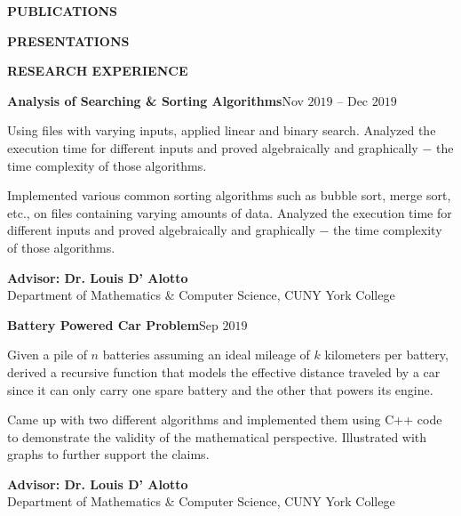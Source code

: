 \documentclass[a4paper, 12pt]{article}
\begin{document}
\newpage
\begin{flushleft}
\faBookOpen\quad\textbf{PUBLICATIONS}
\nocite{*}
\printbibliography[heading=none, type=article]
\end{flushleft}

\begin{flushleft}
\faChalkboardTeacher\quad\textbf{PRESENTATIONS}
\printbibliography[heading=none, type=misc]
\end{flushleft}

\begin{flushleft}
\faAtom\quad\textbf{RESEARCH EXPERIENCE}
\begin{flushleft}
\textbf{Analysis of Searching \& Sorting Algorithms}\hfill Nov $2019$ -- Dec $2019$
\begin{compactitem}
    \item Using files with varying inputs, applied linear and binary search. Analyzed the execution time for different inputs and proved algebraically and graphically $-$ the time complexity of those algorithms.
    \item Implemented various common sorting algorithms such as bubble sort, merge sort, etc., on
files containing varying amounts of data. Analyzed the execution time for different inputs
and proved algebraically and graphically $-$ the time complexity of those algorithms.
\end{compactitem}
\textbf{Advisor: Dr. Louis D' Alotto}\\
Department of Mathematics \& Computer Science, CUNY York College
\end{flushleft}

\begin{flushleft}
\textbf{Battery Powered Car Problem}\hfill Sep $2019$\\
\begin{compactitem}
    \item Given a pile of $n$ batteries assuming an ideal mileage of $k$ kilometers per battery, derived a recursive function that models the effective distance traveled by a car since it can only carry one spare battery and the other that powers its engine.
    \item Came up with two different algorithms and implemented them using C++ code to demonstrate
the validity of the mathematical perspective. Illustrated with graphs to further support the claims.
\end{compactitem}
\textbf{Advisor: Dr. Louis D' Alotto}\\
Department of Mathematics \& Computer Science, CUNY York College
\end{flushleft}


\end{flushleft}
\end{document}

